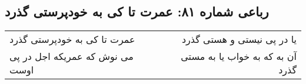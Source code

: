 \begin{center}
\section*{رباعی شماره ۸۱: عمرت تا کی به خودپرستی گذرد}
\label{sec:sh081}
\begin{longtable}{l p{0.5cm} r}
عمرت تا کی به خودپرستی گذرد
&&
یا در پی نیستی و هستی گذرد
\\
می نوش که عمریکه اجل در پی اوست
&&
آن به که به خواب یا به مستی گذرد
\\
\end{longtable}
\end{center}
